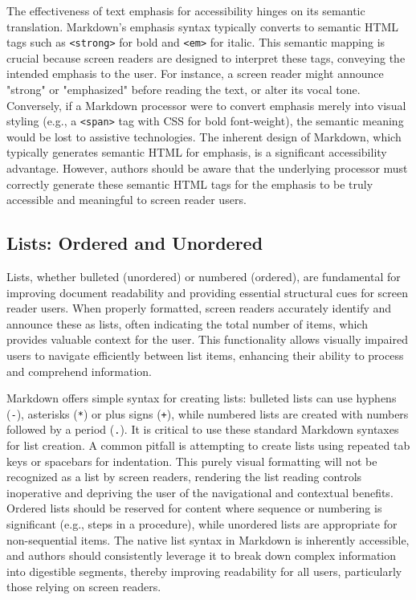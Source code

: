 The effectiveness of text emphasis for accessibility hinges on its semantic translation. Markdown's emphasis syntax typically converts to semantic HTML tags such as \texttt{<strong>} for bold and \texttt{<em>} for italic. This semantic mapping is crucial because screen readers are designed to interpret these tags, conveying the intended emphasis to the user. For instance, a screen reader might announce "strong" or "emphasized" before reading the text, or alter its vocal tone. Conversely, if a Markdown processor were to convert emphasis merely into visual styling (e.g., a \texttt{<span>} tag with CSS for bold font-weight), the semantic meaning would be lost to assistive technologies.\cite{UniversalDesign} The inherent design of Markdown, which typically generates semantic HTML for emphasis, is a significant accessibility advantage. However, authors should be aware that the underlying processor must correctly generate these semantic HTML tags for the emphasis to be truly accessible and meaningful to screen reader users.

\subsection{Lists: Ordered and Unordered}
Lists, whether bulleted (unordered) or numbered (ordered), are fundamental for improving document readability and providing essential structural cues for screen reader users.\cite{DSU,UNIWeb,GitLabDocs} When properly formatted, screen readers accurately identify and announce these as lists, often indicating the total number of items, which provides valuable context for the user.\cite{DSU} This functionality allows visually impaired users to navigate efficiently between list items, enhancing their ability to process and comprehend information.

Markdown offers simple syntax for creating lists: bulleted lists can use hyphens (\texttt{-}), asterisks (\texttt{*}) or plus signs (\texttt{+}), while numbered lists are created with numbers followed by a period (\texttt{.}).\cite{MarkdownGuideExtended} It is critical to use these standard Markdown syntaxes for list creation. A common pitfall is attempting to create lists using repeated tab keys or spacebars for indentation.\cite{DSU,UniversalDesign} This purely visual formatting will not be recognized as a list by screen readers, rendering the list reading controls inoperative and depriving the user of the navigational and contextual benefits.\cite{DSU,UniversalDesign} Ordered lists should be reserved for content where sequence or numbering is significant (e.g., steps in a procedure), while unordered lists are appropriate for non-sequential items.\cite{GitLabDocs} The native list syntax in Markdown is inherently accessible, and authors should consistently leverage it to break down complex information into digestible segments, thereby improving readability for all users, particularly those relying on screen readers.

